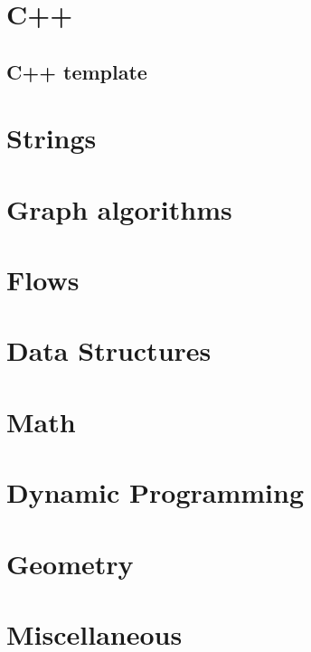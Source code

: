 \section{C++}
\subsection{C++ template}
\raggedbottom
\hrulefill

\section{Strings}

\section{Graph algorithms}

\section{Flows}

\section{Data Structures}

\section{Math}

\section{Dynamic Programming}

\section{Geometry}

\section{Miscellaneous}

